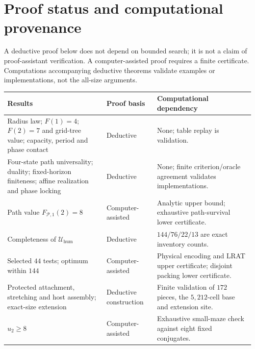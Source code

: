 \section{Proof status and computational provenance}
\label{app:computational-provenance}\label{app:provenance}

A deductive proof below does not depend on bounded search; it is not a claim of
proof-assistant verification. A computer-assisted proof requires a finite
certificate. Computations accompanying deductive theorems validate examples or
implementations, not the all-size arguments.

\begin{center}\small
\begin{tabularx}{\textwidth}{@{}P{.32\textwidth}P{.18\textwidth}Y@{}}
\toprule
Results & Proof basis & Computational dependency \\
\midrule
Radius law; $F(1)=4$; $F(2)=7$ and grid-tree value; capacity, period and phase contact
& Deductive & None; table replay is validation. \\
Four-state path universality; duality; fixed-horizon finiteness; affine realization and phase locking
& Deductive & None; finite criterion/oracle agreement validates implementations. \\
Path value $F_{\mathcal P,1}(2)=8$
& Computer-assisted & Analytic upper bound; exhaustive path-survival lower certificate. \\
Completeness of $\mathcal U_{\mathrm{hum}}$
& Deductive & $144/76/22/13$ are exact inventory counts. \\
Selected $44$ tests; optimum within $144$
& Computer-assisted & Physical encoding and LRAT upper certificate; disjoint packing lower certificate. \\
Protected attachment, stretching and host assembly; exact-size extension
& Deductive construction & Finite validation of $172$ pieces, the $5{,}212$-cell base and extension site. \\
$u_2\ge8$
& Computer-assisted & Exhaustive small-maze check against eight fixed conjugates. \\
\bottomrule
\end{tabularx}
\end{center}


